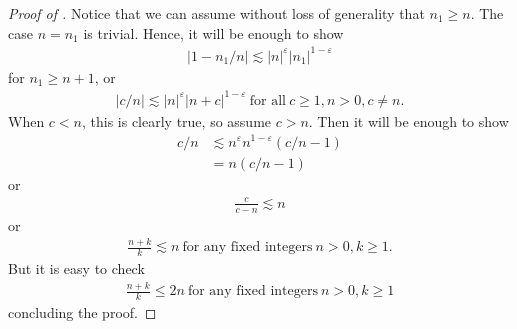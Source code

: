 \documentclass[12pt,reqno]{amsart}
\numberwithin{equation}{section}  %
\renewcommand{\cref}{\Cref}
\newcommand{\ee}{\varepsilon}
\begin{document}
%
%
\begin{proof}[Proof of \cref{lem:key-trick}]
  Notice that we can assume without loss of generality that $n_{1} \ge n$.
  The case $n = n_{1}$ is trivial. Hence, it will be enough to show
  \begin{equation*}
  \begin{split}
    | 1 - n_{1}/n | \lesssim | n |^{\ee} | n_{1} |^{1-\ee}
  \end{split}
  \end{equation*}
  for $n_{1} \ge n+1$, or
  \begin{equation*}
  \begin{split}
    | c/n | \lesssim | n |^{\ee} | n+c |^{1-\ee} \ \text{for all} \ c \ge 1,  n>0, c \neq n.
  \end{split}
  \end{equation*}
  When $c < n$, this is clearly true, so assume $c > n$. Then it will be enough to show
  \begin{equation*}
  \begin{split}
    c/n & \lesssim n^{\ee} n^{1-\ee} ( c/n -1 )
    \\
    & = n(c/n -1)
  \end{split}
  \end{equation*}
  or
  \begin{equation*}
  \begin{split}
  \frac{c}{c -n} \lesssim n
  \end{split}
  \end{equation*}
  or
  \begin{equation*}
  \begin{split}
    \frac{n+k}{k} \lesssim n \ \text{for any fixed integers} \ n > 0, k \ge 1.
  \end{split}
  \end{equation*}
  But it is easy to check
  \begin{equation*}
  \begin{split}
  \frac{n+k}{k} \le 2n \ \text{for any fixed integers} \ n > 0, k \ge 1
  \end{split}
  \end{equation*}
  concluding the proof.

\end{proof}

%
%
%
%
%
%
%
%
%
%
%
\end{document}
